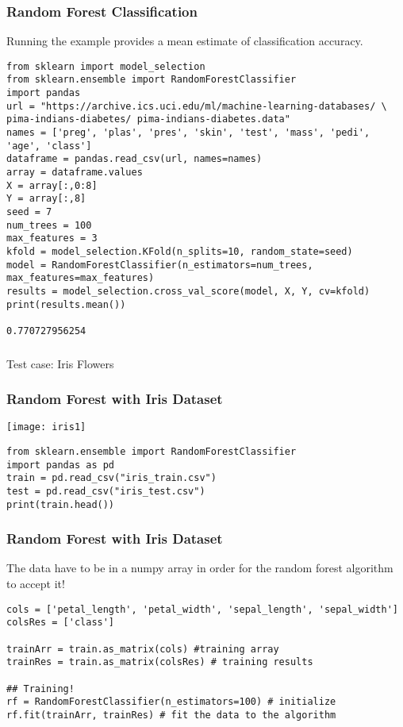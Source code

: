 \begin{frame}[fragile]\frametitle{Random Forest Classification}
Running the example provides a mean estimate of classification accuracy.

\begin{lstlisting}
from sklearn import model_selection
from sklearn.ensemble import RandomForestClassifier
import pandas
url = "https://archive.ics.uci.edu/ml/machine-learning-databases/ \
pima-indians-diabetes/ pima-indians-diabetes.data"
names = ['preg', 'plas', 'pres', 'skin', 'test', 'mass', 'pedi', 'age', 'class']
dataframe = pandas.read_csv(url, names=names)
array = dataframe.values
X = array[:,0:8]
Y = array[:,8]
seed = 7
num_trees = 100
max_features = 3
kfold = model_selection.KFold(n_splits=10, random_state=seed)
model = RandomForestClassifier(n_estimators=num_trees, max_features=max_features)
results = model_selection.cross_val_score(model, X, Y, cv=kfold)
print(results.mean())

0.770727956254
\end{lstlisting}
\end{frame}

\begin{frame}[fragile]\frametitle{}
\begin{center}
{\Large Test case: Iris Flowers}
\end{center}
\end{frame}

\begin{frame}[fragile]\frametitle{Random Forest with Iris Dataset}

\begin{center}
\texttt{[image: iris1]}
\end{center}

\begin{lstlisting}
from sklearn.ensemble import RandomForestClassifier
import pandas as pd
train = pd.read_csv("iris_train.csv")
test = pd.read_csv("iris_test.csv")
print(train.head())
\end{lstlisting}


\end{frame}

\begin{frame}[fragile]\frametitle{Random Forest with Iris Dataset}
The data have to be in a numpy array in order for the random forest algorithm to accept it!
\begin{lstlisting}
cols = ['petal_length', 'petal_width', 'sepal_length', 'sepal_width'] 
colsRes = ['class']

trainArr = train.as_matrix(cols) #training array
trainRes = train.as_matrix(colsRes) # training results

## Training!
rf = RandomForestClassifier(n_estimators=100) # initialize
rf.fit(trainArr, trainRes) # fit the data to the algorithm
\end{lstlisting}
\end{frame}

